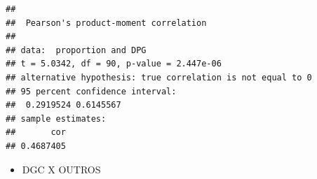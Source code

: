 \documentclass[]{article}
\newenvironment{Shaded}{\begin{snugshade}}{\end{snugshade}}
\newcommand{\KeywordTok}[1]{\textcolor[rgb]{0.13,0.29,0.53}{\textbf{#1}}}
\newcommand{\DataTypeTok}[1]{\textcolor[rgb]{0.13,0.29,0.53}{#1}}
\newcommand{\StringTok}[1]{\textcolor[rgb]{0.31,0.60,0.02}{#1}}
\newcommand{\OperatorTok}[1]{\textcolor[rgb]{0.81,0.36,0.00}{\textbf{#1}}}
\newcommand{\NormalTok}[1]{#1}
\providecommand{\tightlist}{%
  \setlength{\itemsep}{0pt}\setlength{\parskip}{0pt}}
\begin{document}
\begin{Shaded}
\end{Shaded}

\begin{verbatim}
## 
##  Pearson's product-moment correlation
## 
## data:  proportion and DPG
## t = 5.0342, df = 90, p-value = 2.447e-06
## alternative hypothesis: true correlation is not equal to 0
## 95 percent confidence interval:
##  0.2919524 0.6145567
## sample estimates:
##       cor 
## 0.4687405
\end{verbatim}

\begin{itemize}
\tightlist
\item
  DGC X OUTROS
\end{itemize}
\end{document}
